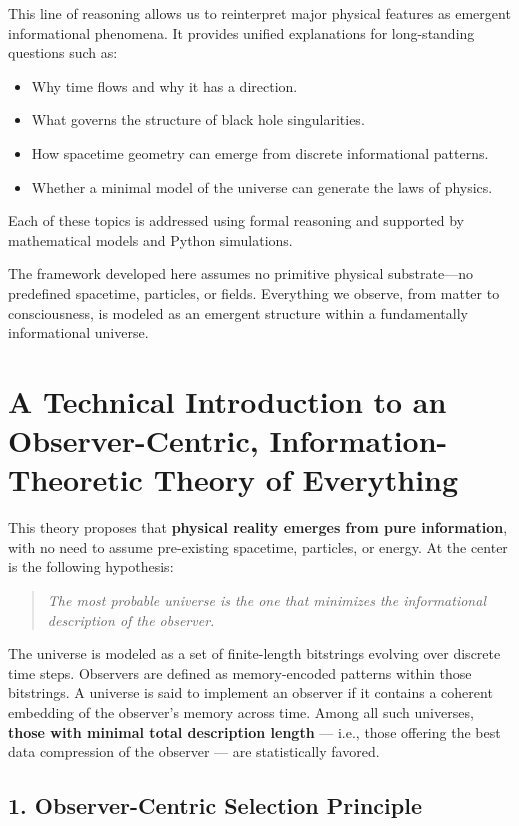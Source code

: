 \documentclass[11pt]{article}
\begin{document}
This line of reasoning allows us to reinterpret major physical features as emergent informational phenomena. It provides unified explanations for long-standing questions such as:
\begin{itemize}
      \item Why time flows and why it has a direction.
      \item What governs the structure of black hole singularities.
      \item How spacetime geometry can emerge from discrete informational patterns.
      \item Whether a minimal model of the universe can generate the laws of physics.
\end{itemize}

Each of these topics is addressed using formal reasoning and supported by mathematical models and Python simulations.

The framework developed here assumes no primitive physical substrate—no predefined spacetime, particles, or fields. Everything we observe, from matter to consciousness, is modeled as an emergent structure within a fundamentally informational universe.


\section*{A Technical Introduction to an Observer-Centric, Information-Theoretic Theory of Everything}

This theory proposes that \textbf{physical reality emerges from pure information}, with no need to assume pre-existing spacetime, particles, or energy. At the center is the following hypothesis:

\begin{quote}
      \textit{The most probable universe is the one that minimizes the informational description of the observer.}
\end{quote}

The universe is modeled as a set of finite-length bitstrings evolving over discrete time steps. Observers are defined as memory-encoded patterns within those bitstrings. A universe is said to implement an observer if it contains a coherent embedding of the observer’s memory across time. Among all such universes, \textbf{those with minimal total description length} — i.e., those offering the best data compression of the observer — are statistically favored.

\subsection*{1. Observer-Centric Selection Principle}
\end{document}
